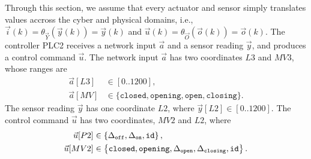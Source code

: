 {{Through this section, we assume that every actuator and sensor simply translates values accross the cyber and physical domains, i.e., $\vec{i}(k)=\theta_{\vec{Y}}(\vec{y}(k))=\vec{y}(k)$ and $\vec{u}(k)=\theta_{\vec{O}}(\vec{o}(k))=\vec{o}(k)$. The controller PLC2 receives a network input $\vec{a}$ and a sensor reading $\vec{y}$, and produces a control command $\vec{u}$. The network input $\vec{a}$ has two coordinates $L3$ and $MV3$, whose ranges are 
\begin{align*}
  \vec{a}[L3]&\in[0..1200],\\ 
  \vec{a}[MV]&\in \{\texttt{closed},\texttt{opening},\texttt{open},\texttt{closing}\}.
\end{align*} 
The sensor reading $\vec{y}$ has one coordinate $L2$, where $\vec{y}[L2]\in[0..1200]$. 
The control command $\vec{u}$ has two coordinates, $MV2$ and $L2$, where 
\begin{align*}
  \vec{u}[P2]&\in\left\{{\Delta}_\texttt{off},{\Delta}_\texttt{on},{\texttt{id}}\right\},\\
  \vec{u}[MV2]&\in\left\{\texttt{closed},\texttt{opening},{\Delta}_\texttt{open},{\Delta}_\texttt{closing}, {\texttt{id}}\right\}.
\end{align*}

}}
